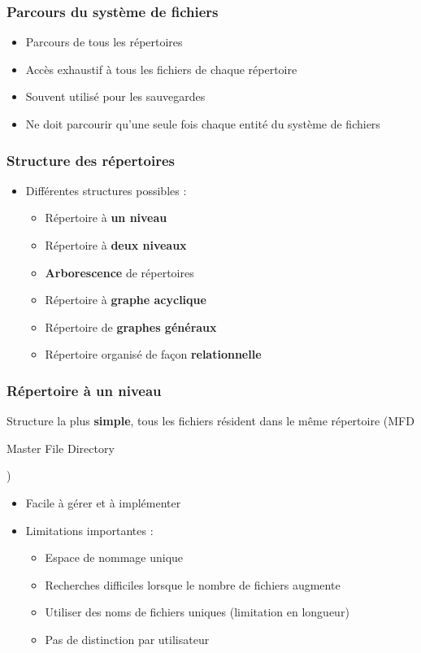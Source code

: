 \begin{frame}
\frametitle{Parcours du système de fichiers}
\begin{itemize}
\item Parcours de tous les répertoires
\item Accès exhaustif à tous les fichiers de chaque répertoire
\item Souvent utilisé pour les sauvegardes
\item Ne doit parcourir qu'une seule fois chaque entité du système de fichiers
\end{itemize}
\end{frame}

\begin{frame}
\frametitle{Structure des répertoires}
\begin{itemize}
\item Différentes structures possibles :
\begin{itemize}
\item Répertoire à \textbf{un niveau}
\item Répertoire à \textbf{deux niveaux}
\item \textbf{Arborescence} de répertoires
\item Répertoire à \textbf{graphe acyclique}
\item Répertoire de \textbf{graphes généraux}
\item Répertoire organisé de façon \textbf{relationnelle}
\end{itemize}
\end{itemize}
\end{frame}

\begin{frame}
\frametitle{Répertoire à un niveau}
Structure la plus \textbf{simple}, tous les fichiers résident dans le même répertoire (MFD \begin{tiny}Master File Directory\end{tiny})
\begin{itemize}
\item Facile à gérer et à implémenter
\item Limitations importantes :
\begin{itemize}
\item Espace de nommage unique
\item Recherches difficiles lorsque le nombre de fichiers augmente
\item Utiliser des noms de fichiers uniques (limitation en longueur)
\item Pas de distinction par utilisateur
\end{itemize}
\end{itemize}
\end{frame}

